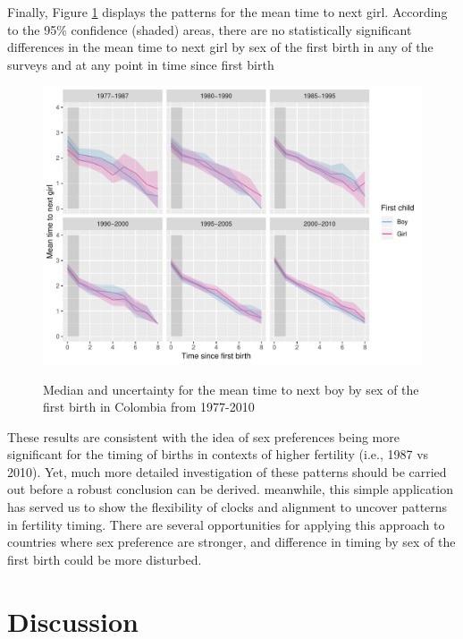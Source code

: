 \documentclass{article}
\begin{document}
Finally,  Figure \ref{fert_03} displays the patterns for the mean time to next girl. According to the 95\% confidence (shaded) areas, there are no statistically significant differences in the mean time to next girl by sex of the first birth in any of the surveys and at any point in time since first birth

\begin{figure}[H]
\centering
    \includegraphics[scale=0.8]{Spells/Figures/colombia/colombia_period_boost_3.pdf}\\
    \caption{Median and uncertainty for the mean time to next boy by sex of the first birth in Colombia from 1977-2010}
        \label{fert_03}
\end{figure}

These results are consistent with the idea of sex preferences being more significant for the timing of births in contexts of higher fertility (i.e., 1987 vs 2010). Yet, much more detailed investigation of these patterns should be carried out before a robust conclusion can be derived. meanwhile, this simple application has served us to show the flexibility of clocks and alignment to uncover patterns in fertility timing. There are several opportunities for applying this approach to countries where sex preference are stronger, and difference in timing by sex of the first birth could be more disturbed.

\section{Discussion}
\end{document}
